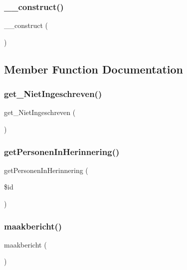 \subsubsection{\texorpdfstring{\+\_\+\+\_\+construct()}{\_\_construct()}}
{\footnotesize\ttfamily \+\_\+\+\_\+construct (\begin{DoxyParamCaption}{ }\end{DoxyParamCaption})}



\subsection{Member Function Documentation}
\mbox{\label{class_mail_a7b5977af30820df385dc88ee0fd2a6bd}} 
\subsubsection{\texorpdfstring{get\+\_\+\+Niet\+Ingeschreven()}{get\_NietIngeschreven()}}
{\footnotesize\ttfamily get\+\_\+\+Niet\+Ingeschreven (\begin{DoxyParamCaption}{ }\end{DoxyParamCaption})}

\mbox{\label{class_mail_a08ee322d4585335986150c5b3504b1a6}} 
\subsubsection{\texorpdfstring{get\+Personen\+In\+Herinnering()}{getPersonenInHerinnering()}}
{\footnotesize\ttfamily get\+Personen\+In\+Herinnering (\begin{DoxyParamCaption}\item[{}]{\$id }\end{DoxyParamCaption})}

\mbox{\label{class_mail_a81e2a70ab567831ba097167138f7a01f}} 
\subsubsection{\texorpdfstring{maakbericht()}{maakbericht()}}
{\footnotesize\ttfamily maakbericht (\begin{DoxyParamCaption}{ }\end{DoxyParamCaption})}

